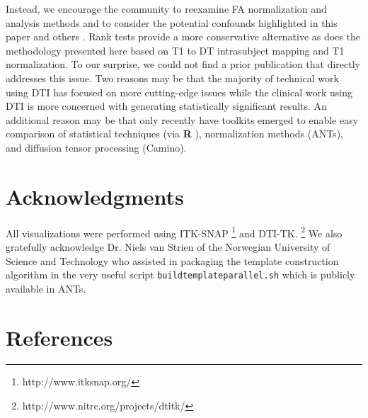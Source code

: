 \documentclass[final,5p,times,twocolumn]{elsarticle}
\begin{document}
Instead, we encourage the community to
reexamine FA normalization and analysis methods and to consider the
potential confounds highlighted in this paper and others
\cite{Ridgway2008}.  Rank tests
provide a more conservative alternative as does the methodology
presented here based on T1 to DT intrasubject mapping and T1
normalization.  To our surprise, we could not find a prior publication that directly
addresses this issue.  Two reasons may be that the majority of
technical work using DTI has focused on more cutting-edge issues while
the clinical work using DTI is more concerned with generating
statistically significant results.  An additional reason may be that
only recently have toolkits emerged to enable easy comparison of
statistical techniques (via {\bf R} \citep{RDevelopmentCoreTeam2011}), normalization methods (ANTs), and
diffusion tensor processing (Camino).






\section*{Acknowledgments}
All visualizations were performed using ITK-SNAP%
\footnote{
http://www.itksnap.org/
}
\citep{Yushkevich2006} and
DTI-TK.%
\footnote{
http://www.nitrc.org/projects/dtitk/
}
We also gratefully acknowledge Dr. Niels van Strien of the Norwegian University of Science and Technology
who assisted in packaging the template construction algorithm in the very useful script \verb#buildtemplateparallel.sh#
which is publicly available in ANTs.

\section*{References}










\end{document}
